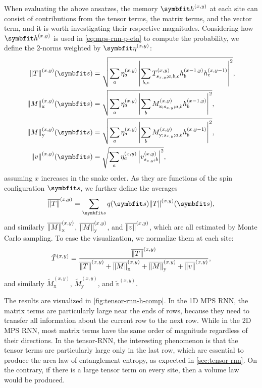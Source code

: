 When evaluating the above ansatzes, the memory $\vh^{(x, y)}$ at each site can consist of contributions from the tensor terms, the matrix terms, and the vector term, and it is worth investigating their respective magnitudes. Considering how $\vh^{(x, y)}$ is used in \cref{eq:mps-rnn-p-eta} to compute the probability, we define the $2$-norms weighted by $\vet^{(x, y)}$:
\begin{align}
\norm{T}^{(x, y)}(\vs) &= \sqrt{\sum_a \eta^{(x, y)}_a \left| \sum_{b, c} T^{(x, y)}_{s_{x, y}; a, b, c} h^{(x - 1, y)}_b h^{(x, y - 1)}_c \right|^2}, \\
\norm{M}^{(x, y)}_\text{x}(\vs) &= \sqrt{\sum_a \eta^{(x, y)}_a \left| \sum_b M^{(x, y)}_{\text{x}; s_{x, y}; a, b} h^{(x - 1, y)}_b \right|^2}, \\
\norm{M}^{(x, y)}_\text{y}(\vs) &= \sqrt{\sum_a \eta^{(x, y)}_a \left| \sum_b M^{(x, y)}_{\text{y}; s_{x, y}; a, b} h^{(x, y - 1)}_b \right|^2}, \\
\norm{v}^{(x, y)}(\vs) &= \sqrt{\sum_a \eta^{(x, y)}_a \left| v^{(x, y)}_{s_{x, y}; b} \right|^2},
\end{align}
assuming $x$ increases in the snake order. As they are functions of the spin configuration $\vs$, we further define the averages
\begin{equation}
\overline{\norm{T}}^{(x, y)} = \sum_\vs q(\vs) \norm{T}^{(x, y)}(\vs),
\end{equation}
and similarly $\overline{\norm{M}}^{(x, y)}_\text{x}$, $\overline{\norm{M}}^{(x, y)}_\text{y}$, and $\overline{\norm{v}}^{(x, y)}$, which are all estimated by Monte Carlo sampling. To ease the visualization, we normalize them at each site:
\begin{equation}
\tilde{T}^{(x, y)} = \frac{\overline{\norm{T}}^{(x, y)}}{\overline{\norm{T}}^{(x, y)} + \overline{\norm{M}}^{(x, y)}_\text{x} + \overline{\norm{M}}^{(x, y)}_\text{y} + \overline{\norm{v}}^{(x, y)}},
\end{equation}
and similarly $\tilde{M}^{(x, y)}_\text{x}$, $\tilde{M}^{(x, y)}_\text{y}$, and $\tilde{v}^{(x, y)}$.

The results are visualized in \cref{fig:tensor-rnn-h-comp}. In the 1D MPS RNN, the matrix terms are particularly large near the ends of rows, because they need to transfer all information about the current row to the next row. While in the 2D MPS RNN, most matrix terms have the same order of magnitude regardless of their directions. In the tensor-RNN, the interesting phenomenon is that the tensor terms are particularly large only in the last row, which are essential to produce the area law of entanglement entropy, as expected in \cref{sec:tensor-rnn}. On the contrary, if there is a large tensor term on every site, then a volume law would be produced.

